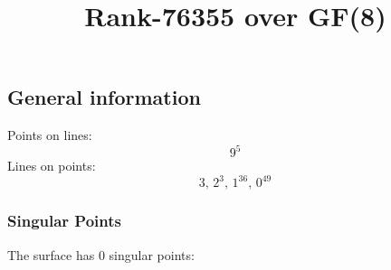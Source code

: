 \documentclass{article}
\newcommand\setTBstruts{\def\T{\rule{0pt}{2.6ex}}%
\def\B{\rule[-1.2ex]{0pt}{0pt}}}
\begin{document}
 
\setTBstruts



{\allowdisplaybreaks%






\title{Rank-76355 over GF(8)}
\author{}%
\maketitle%
%
{}



\subsection*{General information}
Points on lines:
$$
9^5$$
Lines on points:
$$
3,\,2^3,\,1^{36},\,0^{49}$$
\subsubsection*{Singular Points}
The surface has 0 singular points:\\
\begin{align*}
\end{align*}
}
\end{document}
